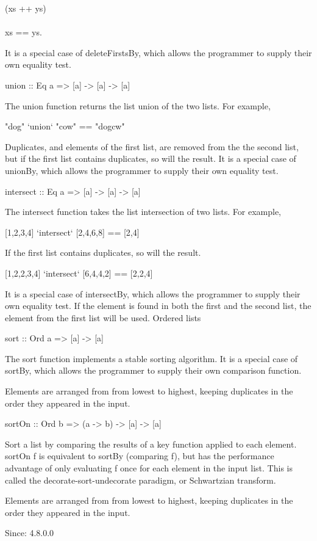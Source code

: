 (xs ++ ys) \\\\ xs == ys.

It is a special case of deleteFirstsBy, which allows the programmer to supply their own equality test.

union :: Eq a => [a] -> [a] -> [a]

The union function returns the list union of the two lists. For example,

"dog" `union` "cow" == "dogcw"

Duplicates, and elements of the first list, are removed from the the second list, but if the first list contains duplicates, so will the result. It is a special case of unionBy, which allows the programmer to supply their own equality test.

intersect :: Eq a => [a] -> [a] -> [a]

The intersect function takes the list intersection of two lists. For example,

[1,2,3,4] `intersect` [2,4,6,8] == [2,4]

If the first list contains duplicates, so will the result.

[1,2,2,3,4] `intersect` [6,4,4,2] == [2,2,4]

It is a special case of intersectBy, which allows the programmer to supply their own equality test. If the element is found in both the first and the second list, the element from the first list will be used.
Ordered lists

sort :: Ord a => [a] -> [a]

The sort function implements a stable sorting algorithm. It is a special case of sortBy, which allows the programmer to supply their own comparison function.

Elements are arranged from from lowest to highest, keeping duplicates in the order they appeared in the input.

sortOn :: Ord b => (a -> b) -> [a] -> [a]

Sort a list by comparing the results of a key function applied to each element. sortOn f is equivalent to sortBy (comparing f), but has the performance advantage of only evaluating f once for each element in the input list. This is called the decorate-sort-undecorate paradigm, or Schwartzian transform.

Elements are arranged from from lowest to highest, keeping duplicates in the order they appeared in the input.

Since: 4.8.0.0

